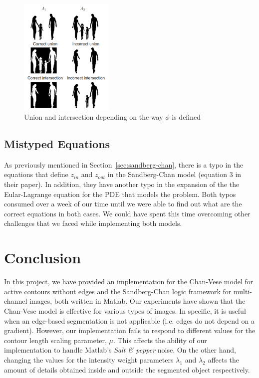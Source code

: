 \documentclass[10pt,twocolumn,letterpaper]{article}
\begin{document}
\begin{figure}[t]
\centering
\includegraphics[width=0.4\textwidth]{phidef.png}
\caption{Union and intersection depending on the way $\phi$ is defined}
\label{fig:phidef}
\end{figure}

\subsection{Mistyped Equations}
As previously mentioned in Section~\ref{sec:sandberg-chan}, there is a typo in the equations that define $z_{in}$ and $z_{out}$ in the Sandberg-Chan model
(equation 3 in their paper). In addition, they have another typo in the expansion of the the Eular-Lagrange equation for the PDE that models the problem. Both
typos consumed over a week of our time until we were able to find out what are the correct equations in both cases. We could have spent this time overcoming
other challenges that we faced while implementing both models.

\section{Conclusion}
\label{sec:concl}
In this project, we have provided an implementation for the Chan-Vese model for active contours without edges and the Sandberg-Chan logic framework for
multi-channel images, both written in Matlab. Our experiments have shown that the Chan-Vese model is effective for various types of images. In specific, it is
useful when an edge-based segmentation is not applicable (i.e. edges do not depend on a gradient). However, our implementation fails to respond to different
values for the contour length scaling parameter, $\mu$. This affects the ability of our implementation to handle Matlab's \textit{Salt \& pepper} noise. On the
other hand, changing the values for the intensity weight parameters $\lambda_1$ and $\lambda_2$ affects the amount of details obtained inside and outside the
segmented object respectively.
\end{document}
